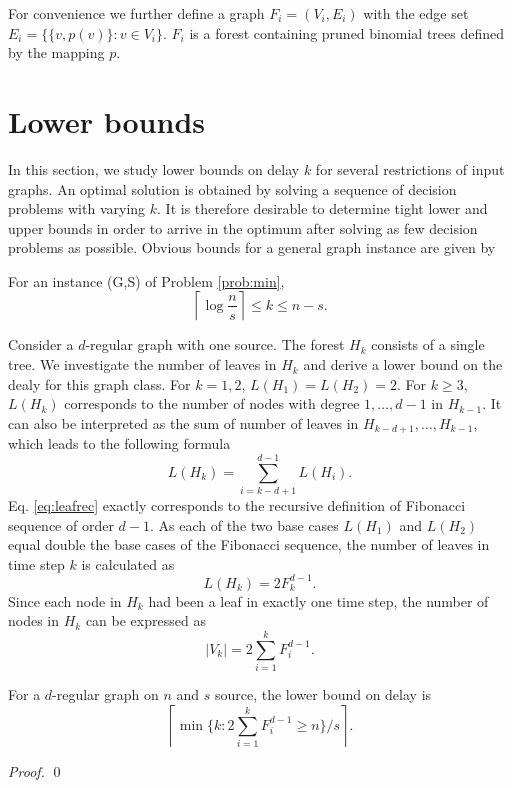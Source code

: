For convenience we further define a graph $F_i=(V_i,E_i)$ with the edge set $E_i=\{\{v,p(v)\}:v\in V_i\}$.
$F_i$ is a forest containing pruned binomial trees defined by the mapping $p$.

%

\section{Lower bounds}
In this section, we study lower bounds on delay $k$ for several restrictions of input graphs.
An optimal solution is obtained by solving a sequence of decision problems with varying $k$. 
It is therefore desirable to determine tight lower and upper bounds in order to arrive in the optimum after solving as few decision problems as possible.
Obvious bounds for a general graph instance are given by
\begin{observation}
For an instance (G,S) of Problem \ref{prob:min},
$$\left\lceil\log\frac{n}{s}\right\rceil\leq k \leq n-s.$$
\end{observation}

Consider a $d$-regular graph with one source.
The forest $H_k$ consists of a single tree.
We investigate the number of leaves in $H_k$ and derive a lower bound on the dealy for this graph class.
For $k=1,2$, $L(H_1)=L(H_2)=2$.
For $k\geq 3$, $L(H_k)$ corresponds to the number of nodes with degree $1,\dots,d-1$ in $H_{k-1}$.
It can also be interpreted as the sum of number of leaves in $H_{k-d+1},\dots,H_{k-1}$, which leads to the following formula
\begin{equation}
\label{eq:leafrec}
L(H_k)=\sum\limits_{i=k-d+1}^{d-1} L(H_i).
\end{equation}  
Eq. \eqref{eq:leafrec} exactly corresponds to the recursive definition of Fibonacci sequence of order $d-1$.
As each of the two base cases $L(H_1)$ and $L(H_2)$ equal double the base cases of the Fibonacci sequence, the number of leaves in time step $k$ is calculated as
\begin{equation}
\label{eq:fibleaf}
L(H_k)=2 F^{d-1}_k.
\end{equation}  
Since each node in $H_k$ had been a leaf in exactly one time step, the number of nodes in $H_k$ can be expressed as 
\begin{equation}
\label{eq:fibcnt}
|V_k|=2\sum\limits_{i=1}^k F^{d-1}_i.
\end{equation}

\begin{proposition}
For a $d$-regular graph on $n$ and $s$ source, the lower bound on delay is 
\begin{equation}
\label{lem:lbreg1}
\left\lceil\min\{k:2\sum\limits_{i=1}^k F^{d-1}_i\geq n\}/s\right\rceil.
\end{equation}
\end{proposition}
\begin{proof}
\qed
\end{proof}


